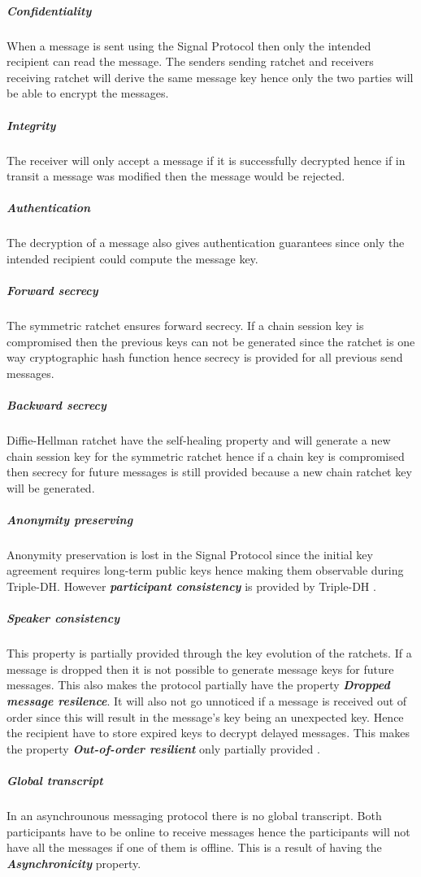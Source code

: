 \subparagraph{Confidentiality} When a message is sent using the Signal Protocol then only the intended recipient can read the message. The senders sending ratchet and receivers receiving ratchet will derive the same message key hence only the two parties will be able to encrypt the messages. 

\subparagraph{Integrity} The receiver will only accept a message if it is successfully decrypted hence if in transit a message was modified then the message would be rejected.

\subparagraph{Authentication} The decryption of a message also gives authentication guarantees since only the intended recipient could compute the message key.

\subparagraph{Forward secrecy} The symmetric ratchet ensures forward secrecy. If a chain session key is compromised then the previous keys can not be generated since the ratchet is one way cryptographic hash function hence secrecy is provided for all previous send messages.  

\subparagraph{Backward secrecy} Diffie-Hellman ratchet have the self-healing property and will generate a new chain session key for the symmetric ratchet hence if a chain key is compromised then secrecy for future messages is still provided because a new chain ratchet key will be generated.

\subparagraph{Anonymity preserving}

Anonymity preservation is lost in the Signal Protocol since the initial key agreement requires long-term public keys hence making them observable during Triple-DH. However \textbf{\emph{participant consistency}} is provided by Triple-DH \cite{sok}. %

\subparagraph{Speaker consistency}
This property is partially provided through the key evolution of the ratchets. If a message is dropped then it is not possible to generate message keys for future messages. This also makes the protocol partially have the property \emph{\textbf{Dropped message resilence}}. It will also not go unnoticed if a message is received out of order since this will result in the message's key being an unexpected key. Hence the recipient have to store expired keys to decrypt delayed messages. This makes the property \emph{\textbf{Out-of-order resilient}} only partially provided \cite{sok}.

\subparagraph{Global transcript} 
In an asynchrounous messaging protocol there is no global transcript. Both participants have to be online to receive messages hence the participants will not have all the messages if one of them is offline. This is a result of having the \textbf{\emph{Asynchronicity}} property.


